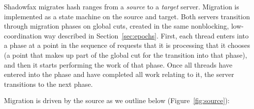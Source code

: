 Shadowfax migrates hash ranges from a \emph{source} to a \emph{target} server.
%
Migration is implemented as a state machine on the source and target.
%
Both servers transition through migration phases on global cuts, created in the
same nonblocking, low-coordination way described in Section~\ref{sec:epochs}.
%
First, each thread enters into a phase at a point in the sequence of requests
that it is processing that it chooses (a point that makes up part of the global
cut for the transition into that phase), and then it starts performing the work
of that phase.
%
Once all threads have entered into the phase and have completed all work
relating to it, the server transitions to the next phase.

Migration is driven by the source as we outline below (Figure~\ref{fig:source}):
%
%

